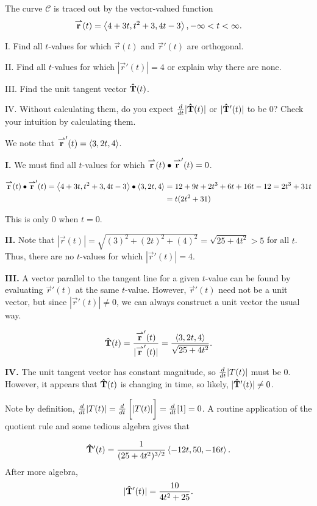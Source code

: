 \documentclass[noauthor]{ximera}
\begin{document}
\begin{problem}
The curve $\mathcal{C}$ is traced out by the vector-valued function \[ {\overset{\boldsymbol{\rightharpoonup}}{\mathbf{r}}}(t) = \left\langle 4+3t, t^2+3,4t-3\right\rangle, -\infty < t <\infty.\]   


I. Find all $t$-values for which $\vec{r}(t)$ and $\vec{r}'(t)$ are orthogonal.

II. Find all $t$-values for which $|\vec{r}'(t)| = 4$ or explain why there are none. 

III. Find the unit tangent vector $\mathbf{\hat{T}}(t)$.  

IV.  Without calculating them, do you expect $\frac{\mathop{}\!d}{\mathop{}\!d t} |\mathbf{\hat{T}}(t)|$ or $|\mathbf{\hat{T}}'(t)|$ to be $0$?  Check your intuition by calculating them.
 
 \begin{freeResponse}  We note that ${\overset{\boldsymbol{\rightharpoonup}}{\mathbf{r}}}'(t) = \left\langle 3,2t,4\right\rangle$.
 
 \textbf{I.} We must find all $t$-values for which ${\overset{\boldsymbol{\rightharpoonup}}{\mathbf{r}}}(t) \bullet {\overset{\boldsymbol{\rightharpoonup}}{\mathbf{r}}}'(t) = 0$.
 
 \begin{align*}
 {\overset{\boldsymbol{\rightharpoonup}}{\mathbf{r}}}(t) \bullet {\overset{\boldsymbol{\rightharpoonup}}{\mathbf{r}}}'(t) = \left\langle 4+3t, t^2+3,4t-3\right\rangle \bullet  \left\langle 3,2t,4\right\rangle &= 12+9t+2t^3+6t+16t-12 =2t^3+31t\\
 &= t(2t^2+31)
 \end{align*}
 
 This is only $0$ when $t=0$.
 
 \textbf{II.} Note that $|\vec{r}(t)| = \sqrt{(3)^2+(2t)^2+(4)^2} = \sqrt{25+4t^2} > 5$ for all $t$.  Thus, there are no $t$-values for which $|\vec{r}'(t)| = 4$.
 
 \textbf{III.} A vector parallel to the tangent line for a given $t$-value can be found by evaluating $\vec{r}'(t)$ at the same $t$-value.  However, $\vec{r}'(t)$ need not be a unit vector, but since $|\vec{r}'(t)| \neq 0$, we can always construct a unit vector the usual way.
 
 \[
 \mathbf{\hat{T}}(t) = \frac{{\overset{\boldsymbol{\rightharpoonup}}{\mathbf{r}}}'(t)}{|{\overset{\boldsymbol{\rightharpoonup}}{\mathbf{r}}}'(t)|} = \frac{\left\langle 3,2t,4\right\rangle}{ \sqrt{25+4t^2}}.
 \]
 
 \textbf{IV.} The unit tangent vector has constant magnitude, so $\frac{\mathop{}\!d}{\mathop{}\!d t} |T(t)|$ must be $0$.  However, it appears that $\mathbf{\hat{T}}(t)$ is changing in time, so likely, $|\mathbf{\hat{T}}'(t)| \neq 0$.
 
 Note by definition, $\frac{\mathop{}\!d}{\mathop{}\!d t} |T(t)| = \frac{\mathop{}\!d}{\mathop{}\!d t} \left[ \vphantom{\bigg|}|T(t)|\right] = \frac{\mathop{}\!d}{\mathop{}\!d t}[1] =0$.  A routine application of the quotient rule and some tedious algebra gives that 
 
 \[
 \mathbf{\hat{T}}'(t) = \frac{1}{(25+4t^2)^{3/2}}\left\langle -12t, 50 , -16t\right\rangle. 
 \]
 After more algebra, 
 \[
 |\mathbf{\hat{T}}'(t)| = \frac{10}{4t^2+25}.
 \] 
 \end{freeResponse}
\end{problem}
\end{document}

